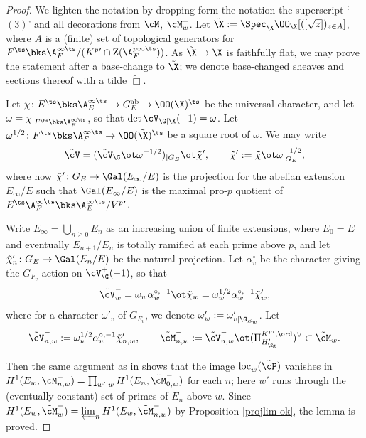 \begin{proof}
We lighten the notation by dropping form the notation the superscript `$(3)$'  and all decorations from $\cM$, $\cM_{w}^{-}$. Let  $\tilde{\X} := \Spec_{\X} \OO_{\X} [([\sqrt{z}])_{z\in A}]$, where $A$ is a (finite) set of topological generators for $F^{\ts}\bks \A_{F}^{\infty\ts}/(K^{p}{}'\cap {\rm Z}(\A_{F}^{p\infty\ts}))$. As $\tilde{\X}\to \X$ is faithfully flat, we may prove the statement after a base-change to $\tilde{\X}$; we denote base-changed sheaves and sections thereof with a tilde $\tilde{\Box}$.

Let $\chi\colon E^{\ts} \bks \A_{E}^{\infty\ts}\to G_{E}^{\rm ab}\to \OO(\X)^{\ts}$ be the universal character, and let  $\omega =\chi_{|F^{\ts}\bks \A_{F}^{\infty\ts}}$, so that $\det \cV_{\G|\X} (-1)=\omega$. Let $\omega^{1/2} \colon F^{\ts}\bks \A_{F}^{\infty\ts} \to \OO(\tilde{\X})^{\ts}$ be a square root of $\omega$.
  We may write
   $$\tilde{\cV} =(\tilde{\cV}_{\G}\ot \omega^{-1/2})_{|G_{E}} \ot \tilde{\chi}' ,
  \qquad  \tilde{\chi}' :=\tilde{\chi} \ot \omega^{-1/2}_{|G_{E}},$$
where now   $\tilde{\chi}'\colon G_{E} \to \Gal(E_{\infty}/E)$  is the projection for the abelian extension $E_{\infty}/E$ such that  $\Gal(E_{\infty}/E) $ is the maximal pro-$p$ quotient of $E^{\ts}\A_{F}^{\infty\ts} \bks \A_{E}^{\infty\ts} /V^{p}{}'$.


Write $E_{\infty}=\bigcup_{n\geq0} E_{n}$ as an increasing union of finite extensions, where $E_{0}=E$ and  eventually $E_{n+1}/E_{n}$ is totally ramified at each prime above $p$, and let
$\tilde{\chi}'_{n}\colon G_{E}\to \Gal(E_{n}/E)$ be the natural projection.
  Let $\alpha^{\circ}_{v}$ be the character giving the $G_{F_{v}}$-action on $\cV_{\G}^{+}(-1)$,
  so that $$\tilde{\cV}^{-}_{w}= \omega_{w}\alpha_{w}^{\circ, -1}\ot\tilde{\chi}_{w}= \omega^{1/2}_{w}\alpha^{\circ, -1}_{w} \tilde{\chi}'_{w},$$
where for a character $\omega'_{v}$ of $G_{F_{v}}$, we denote $\omega'_{w}:=\omega'_{v|\G_{E_{w}}}$. Let
$$\tilde{\cV}^{-}_{n,w} :=\omega_{w}^{1/2}\alpha_{w}^{\circ, -1} \tilde{\chi}'_{n,w}, \qquad
\tilde{\cM}^{-}_{n,w}:= \tilde{\cV}^{-}_{n,w}\ot (\Pi^{K^{p}{}', \ord}_{{H_{\Sg}'}} )^{\vee}\subset \tilde\cM_{w}.$$

 Then the same argument as in \cite[proof of Proposition 2.4.5,  primes $v\vert p$]{howbig} shows that
the image  ${\rm loc}_{w}^{-}(\tilde{\cP})$ vanishes in $H^{1}(E_{w},\cM^{-}_{n,w})= \prod_{w'\vert w} H^{1}(E_{n},\tilde{\cM}^{-}_{0,w})$ for each $n$; here $w'$ runs through the (eventually constant) set of primes of $E_{n}$ above $w$. Since $H^{1}(E_{w},\tilde{\cM}^{-}_{w}) =\varprojlim_{n} H^{1}(E_{w}, \tilde\cM^{-}_{n, w})$ by Proposition \ref{projlim ok},  the lemma is proved.
  \end{proof}

















